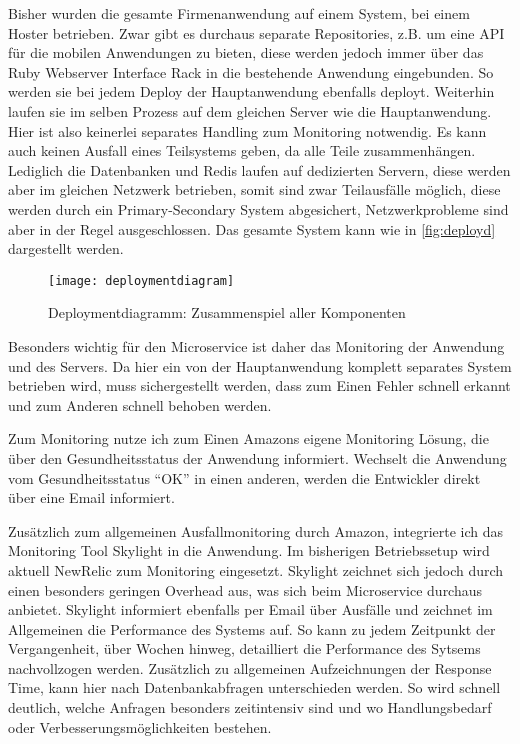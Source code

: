 Bisher wurden die gesamte Firmenanwendung auf einem System, bei einem Hoster betrieben. Zwar gibt es durchaus separate Repositories, z.B. um eine API für die mobilen Anwendungen zu bieten, diese werden jedoch immer über das Ruby Webserver Interface Rack in die bestehende Anwendung eingebunden. So werden sie bei jedem Deploy der Hauptanwendung ebenfalls deployt. Weiterhin laufen sie im selben Prozess auf dem gleichen Server wie die Hauptanwendung. Hier ist also keinerlei separates Handling zum Monitoring notwendig. Es kann auch keinen Ausfall eines Teilsystems geben, da alle Teile zusammenhängen. Lediglich die Datenbanken und Redis laufen auf dedizierten Servern, diese werden aber im gleichen Netzwerk betrieben, somit sind zwar Teilausfälle möglich, diese werden durch ein Primary-Secondary System abgesichert, Netzwerkprobleme sind aber in der Regel ausgeschlossen. Das gesamte System kann wie in \autoref{fig:deployd} dargestellt werden.

\begin{figure}[!ht]
    \centering
    \caption{Deploymentdiagramm: Zusammenspiel aller Komponenten}
    \label{fig:deployd}
    \texttt{[image: deploymentdiagram]}
\end{figure}

Besonders wichtig für den Microservice ist daher das Monitoring der Anwendung und des Servers. Da hier ein von der Hauptanwendung komplett separates System betrieben wird, muss sichergestellt werden, dass zum Einen Fehler schnell erkannt und zum Anderen schnell behoben werden. 

Zum Monitoring nutze ich zum Einen Amazons eigene Monitoring Lösung, die über den Gesundheitsstatus der Anwendung informiert. Wechselt die Anwendung vom Gesundheitsstatus ``OK'' in einen anderen, werden die Entwickler direkt über eine Email informiert.

Zusätzlich zum allgemeinen Ausfallmonitoring durch Amazon, integrierte ich das Monitoring Tool Skylight\cite{skylight} in die Anwendung. Im bisherigen Betriebssetup wird aktuell NewRelic\cite{newrelic} zum Monitoring eingesetzt. Skylight zeichnet sich jedoch durch einen besonders geringen Overhead aus, was sich beim Microservice durchaus anbietet. Skylight informiert ebenfalls per Email über Ausfälle und zeichnet im Allgemeinen die Performance des Systems auf. So kann zu jedem Zeitpunkt der Vergangenheit, über Wochen hinweg, detailliert die Performance des Sytsems nachvollzogen werden. Zusätzlich zu allgemeinen Aufzeichnungen der Response Time, kann hier nach Datenbankabfragen unterschieden werden. So wird schnell deutlich, welche Anfragen besonders zeitintensiv sind und wo Handlungsbedarf oder Verbesserungsmöglichkeiten bestehen. 

